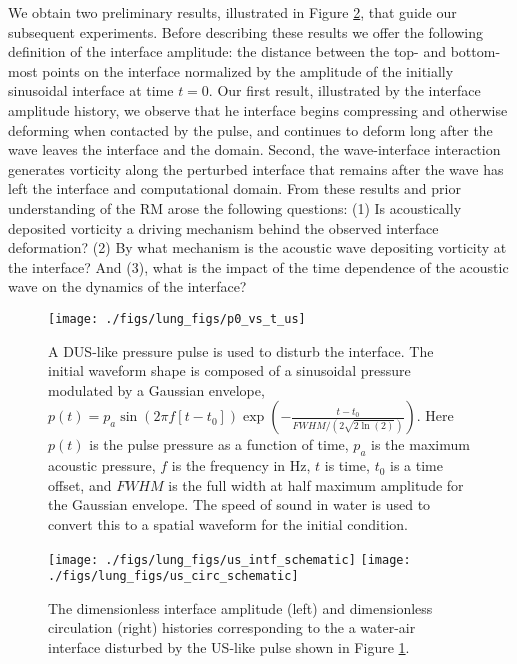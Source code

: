 We obtain two preliminary results, illustrated in Figure
\ref{fig:us_circ_interface}, that guide our subsequent
experiments. Before describing these results we offer the following
definition of the interface amplitude: the distance between the top-
and bottom-most points on the interface normalized by the amplitude of
the initially sinusoidal interface at time $t=0$. Our first result,
illustrated by the interface amplitude history, we observe that he
interface begins compressing and otherwise deforming when contacted by
the pulse, and continues to deform long after the wave leaves the
interface and the domain. Second, the wave-interface interaction
generates vorticity along the perturbed interface that remains after
the wave has left the interface and computational domain. From these
results and prior understanding of the \ac{RM} arose the following
questions: (1) Is acoustically deposited vorticity a driving mechanism
behind the observed interface deformation? (2) By what mechanism is
the acoustic wave depositing vorticity at the interface? And (3), what
is the impact of the time dependence of the acoustic wave on the
dynamics of the interface?
\begin{figure}
  \centering
  \texttt{[image: ./figs/lung\_figs/p0\_vs\_t\_us]}
  \caption{A \ac{DUS}-like pressure pulse is used to disturb the
    interface. The initial waveform shape is composed of a sinusoidal
    pressure modulated by a Gaussian envelope,
    $p(t)=p_a \sin{\left( 2\pi f \left[ t-t_0\right]\right)}
    \exp{\left(-\frac{t-t_0}{FWHM/\left(2\sqrt{2\ln{\left(2\right)}}\right)}\right)}$. Here
    $p(t)$ is the pulse pressure as a function of time, $p_a$ is the
    maximum acoustic pressure, $f$ is the frequency in Hz, $t$ is time,
    $t_0$ is a time offset, and $FWHM$ is the full width at half maximum
    amplitude for the Gaussian envelope. The speed of sound in water is
    used to convert this to a spatial waveform for the initial
    condition.}
  \label{fig:p0_vs_t_us}
\end{figure}

\begin{figure}
  \centering
  \texttt{[image: ./figs/lung\_figs/us\_intf\_schematic]} \hfill
  \texttt{[image: ./figs/lung\_figs/us\_circ\_schematic]}
  \caption{The dimensionless interface amplitude (left) and
    dimensionless circulation (right) histories corresponding to the a
    water-air interface disturbed by the US-like pulse shown in Figure
    \ref{fig:p0_vs_t_us}.}
  \label{fig:us_circ_interface}

\end{figure}



